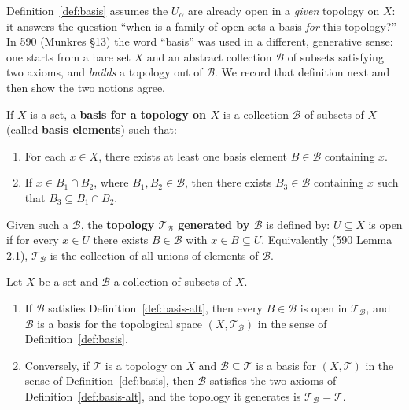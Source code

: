 \documentclass[11pt]{report}
\makeatletter
\newcounter{defcounter}[section]
\newcounter{thmcounter}[section]
\newcommand{\thmlabel}[1]{\edef\@currentlabel{\arabic{section}.\arabic{thmcounter}}\label{#1}}
\newcommand{\deflabel}[1]{\edef\@currentlabel{\arabic{section}.\arabic{defcounter}}\label{#1}}
\newcommand{\leeref}[1]{\par\smallskip{\raggedleft\footnotesize\textsc{Lee}:\ #1\par}}
\makeatother
\begin{document}
\begin{rembox}\label{rem:two-notions-basis}
Definition~\ref{def:basis} assumes the $U_\alpha$ are already open in a \emph{given} topology on $X$: it answers the question ``when is a family of open sets a basis \emph{for} this topology?'' In 590 (Munkres \S13) the word ``basis'' was used in a different, generative sense: one starts from a bare set $X$ and an abstract collection $\mathcal{B}$ of subsets satisfying two axioms, and \emph{builds} a topology out of $\mathcal{B}$. We record that definition next and then show the two notions agree.
\end{rembox}

\begin{defbox}\deflabel{def:basis-alt}
If $X$ is a set, a \textbf{basis for a topology on $X$} is a collection $\mathcal{B}$ of subsets of $X$ (called \textbf{basis elements}) such that:
\begin{enumerate}
    \item For each $x \in X$, there exists at least one basis element $B \in \mathcal{B}$ containing $x$.
    \item If $x \in B_1 \cap B_2$, where $B_1, B_2 \in \mathcal{B}$, then there exists $B_3 \in \mathcal{B}$ containing $x$ such that $B_3 \subseteq B_1 \cap B_2$.
\end{enumerate}
Given such a $\mathcal{B}$, the \textbf{topology $\mathcal{T}_{\mathcal{B}}$ generated by $\mathcal{B}$} is defined by: $U \subseteq X$ is open if for every $x \in U$ there exists $B \in \mathcal{B}$ with $x \in B \subseteq U$. Equivalently (590 Lemma 2.1), $\mathcal{T}_{\mathcal{B}}$ is the collection of all unions of elements of $\mathcal{B}$.
\leeref{App.~A, \emph{Topological Spaces}}
\end{defbox}

\begin{propbox}\thmlabel{prop:two-definitions-basis-agree}
Let $X$ be a set and $\mathcal{B}$ a collection of subsets of $X$.
\begin{enumerate}
    \item[(a)] If $\mathcal{B}$ satisfies Definition~\ref{def:basis-alt}, then every $B \in \mathcal{B}$ is open in $\mathcal{T}_{\mathcal{B}}$, and $\mathcal{B}$ is a basis for the topological space $(X, \mathcal{T}_{\mathcal{B}})$ in the sense of Definition~\ref{def:basis}.
    \item[(b)] Conversely, if $\mathcal{T}$ is a topology on $X$ and $\mathcal{B} \subseteq \mathcal{T}$ is a basis for $(X, \mathcal{T})$ in the sense of Definition~\ref{def:basis}, then $\mathcal{B}$ satisfies the two axioms of Definition~\ref{def:basis-alt}, and the topology it generates is $\mathcal{T}_{\mathcal{B}} = \mathcal{T}$.
\end{enumerate}
\end{propbox}
\end{document}
